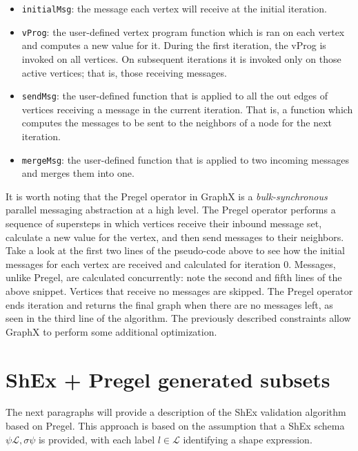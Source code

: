 \begin{itemize}
    \item \texttt{initialMsg}: the message each vertex will receive at the initial iteration.
    \item \texttt{vProg}: the user-defined vertex program function which is ran on each vertex and computes a new value for it. During the first iteration, the vProg is invoked on all vertices. On subsequent iterations it is invoked only on those active vertices; that is, those receiving messages.
    \item \texttt{sendMsg}: the user-defined function that is applied to all the out edges of vertices receiving a message in the current iteration. That is, a function which computes the messages to be sent to the neighbors of a node for the next iteration.
    \item \texttt{mergeMsg}: the user-defined function that is applied to two incoming messages and merges them into one.
\end{itemize}

\begin{pseudocode}
    
\end{pseudocode}

It is worth noting that the Pregel operator in GraphX is a \textit{bulk-synchronous} parallel messaging abstraction at a high level. The Pregel operator performs a sequence of supersteps in which vertices receive their inbound message set, calculate a new value for the vertex, and then send messages to their neighbors. Take a look at the first two lines of the pseudo-code above to see how the initial messages for each vertex are received and calculated for iteration 0. Messages, unlike Pregel, are calculated concurrently: note the second and fifth lines of the above snippet. Vertices that receive no messages are skipped. The Pregel operator ends iteration and returns the final graph when there are no messages left, as seen in the third line of the algorithm. The previously described constraints allow GraphX to perform some additional optimization.

\section{ShEx + Pregel generated subsets}

The next paragraphs will provide a description of the ShEx validation algorithm based on Pregel. This approach is based on the assumption that a ShEx schema $\psi \mathcal{L},\sigma \psi$ is provided,  with each label $l \in \mathcal{L}$ identifying a shape expression.

